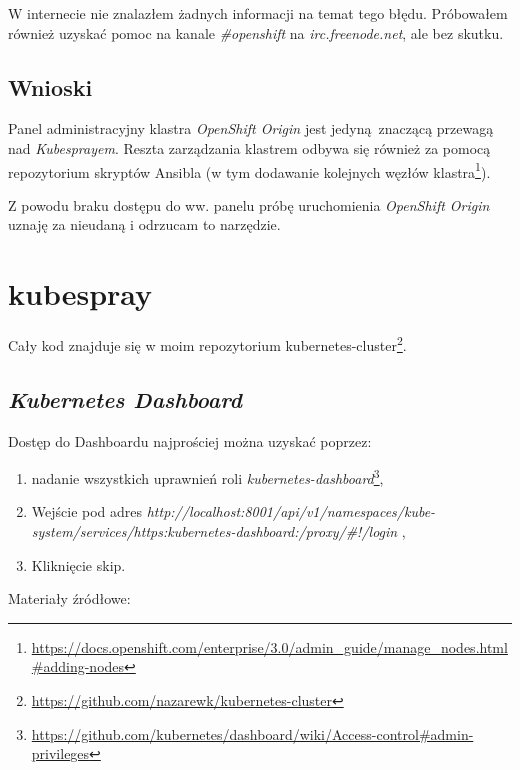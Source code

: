 \documentclass[a4paper,12pt,twoside,openany]{report}
\providecommand{\tightlist}{%
  \setlength{\itemsep}{0pt}\setlength{\parskip}{0pt}}
\DeclareRobustCommand{\href}[2]{#2\footnote{\url{#1}}}
\begin{document}
W internecie nie znalazłem żadnych informacji na temat tego błędu.
Próbowałem również uzyskać pomoc na kanale \emph{\#openshift} na
\emph{irc.freenode.net}, ale bez skutku.

\hypertarget{wnioski-3}{%
\subsection{Wnioski}\label{wnioski-3}}

Panel administracyjny klastra \emph{OpenShift Origin} jest
jedyną~znaczącą przewagą nad \emph{Kubesprayem}. Reszta zarządzania
klastrem odbywa się również za pomocą repozytorium skryptów Ansibla
(\href{https://docs.openshift.com/enterprise/3.0/admin_guide/manage_nodes.html\#adding-nodes}{w
tym dodawanie kolejnych węzłów klastra}).

Z powodu braku dostępu do ww. panelu próbę uruchomienia \emph{OpenShift
Origin} uznaję za nieudaną i odrzucam to narzędzie.

\hypertarget{kubespray-1}{%
\section{kubespray}\label{kubespray-1}}

Cały kod znajduje się w moim repozytorium
\href{https://github.com/nazarewk/kubernetes-cluster}{kubernetes-cluster}.

\hypertarget{kubernetes-dashboard-1}{%
\subsection{\texorpdfstring{\emph{Kubernetes
Dashboard}}{Kubernetes Dashboard}}\label{kubernetes-dashboard-1}}

Dostęp do Dashboardu najprościej można uzyskać poprzez:

\begin{enumerate}
\def\labelenumi{\arabic{enumi}.}
\tightlist
\item
  \href{https://github.com/kubernetes/dashboard/wiki/Access-control\#admin-privileges}{nadanie
  wszystkich uprawnień roli \emph{kubernetes-dashboard}},
\item
  Wejście pod adres
  \emph{http://localhost:8001/api/v1/namespaces/kube-system/services/https:kubernetes-dashboard:/proxy/\#!/login}
  ,
\item
  Kliknięcie skip.
\end{enumerate}

Materiały źródłowe:
\end{document}
